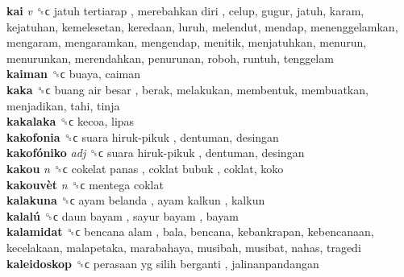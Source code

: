 \textbf{kai} \emph{v}  ␝ϲ   jatuh tertiarap ,  merebahkan diri , celup, gugur, jatuh, karam, kejatuhan, kemelesetan, keredaan, luruh, melendut, mendap, menenggelamkan, mengaram, mengaramkan, mengendap, menitik, menjatuhkan, menurun, menurunkan, merendahkan, penurunan, roboh, runtuh, tenggelam  \\
\textbf{kaiman} ␝ϲ  buaya, caiman  \\
\textbf{kaka} ␝ϲ   buang air besar , berak, melakukan, membentuk, membuatkan, menjadikan, tahi, tinja  \\
\textbf{kakalaka} ␝ϲ  kecoa, lipas  \\
\textbf{kakofonia} ␝ϲ   suara hiruk-pikuk , dentuman, desingan  \\
\textbf{kakofóniko} \emph{adj}  ␝ϲ   suara hiruk-pikuk , dentuman, desingan  \\
\textbf{kakou} \emph{n}  ␝ϲ   cokelat panas ,  coklat bubuk , coklat, koko  \\
\textbf{kakouvèt} \emph{n}  ␝ϲ   mentega coklat   \\
\textbf{kalakuna} ␝ϲ   ayam belanda ,  ayam kalkun , kalkun  \\
\textbf{kalalú} ␝ϲ   daun bayam ,  sayur bayam , bayam  \\
\textbf{kalamidat} ␝ϲ   bencana alam , bala, bencana, kebankrapan, kebencanaan, kecelakaan, malapetaka, marabahaya, musibah, musibat, nahas, tragedi  \\
\textbf{kaleidoskop} ␝ϲ   perasaan yg silih berganti , jalinanpandangan  \\
